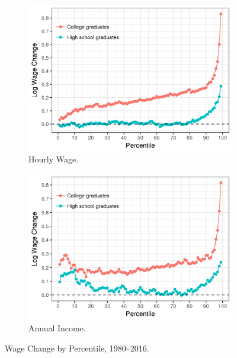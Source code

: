 \documentclass[notitlepage,12pt]{article}
\begin{document}
\begin{figure}[H]
\centering
\begin{subfigure}{.5\textwidth}
  \centering
  \caption{Hourly Wage.}
  \includegraphics[width=\textwidth]{hour_wage_change.png}
\end{subfigure}%
\begin{subfigure}{.5\textwidth}
  \centering
  \caption{Annual Income.}
  \includegraphics[width=\textwidth]{annual_wage_change.png}
\end{subfigure}
\caption{Wage Change by Percentile, 1980--2016.}
\end{figure}
\end{document}

